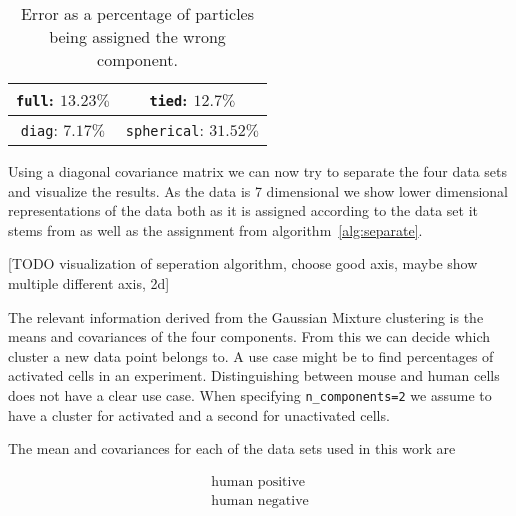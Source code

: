 \begin{table}[h!]
	\centering
	\begin{tabular}{|c|c|}
		\hline
		\texttt{full}: $13.23\%$ & \texttt{tied}: $12.7\%$ \\
		\hline
		\texttt{diag}: $7.17\%$ & \texttt{spherical}: $31.52\%$ \\
		\hline
	\end{tabular}
	\label{tab:covariance_type_comparison}
	\caption{Error as a percentage of particles being assigned the wrong component.}
\end{table}

Using a diagonal covariance matrix we can now try to separate the four data sets and visualize the results. As the data is 7 dimensional we show lower dimensional representations of the data both as it is assigned according to the data set it stems from as well as the assignment from algorithm~\ref{alg:separate}.

[TODO visualization of seperation algorithm, choose good axis, maybe show multiple different axis, 2d]

The relevant information derived from the Gaussian Mixture clustering is the means and covariances of the four components. From this we can decide which cluster a new data point belongs to. A use case might be to find percentages of activated cells in an experiment. Distinguishing between mouse and human cells does not have a clear use case. When specifying \texttt{n\_components=2} we assume to have a cluster for activated and a second for unactivated cells.

The mean and covariances for each of the data sets used in this work are 

\begin{align*}
	\text{human positive}\\
	\text{human negative}
\end{align*}
